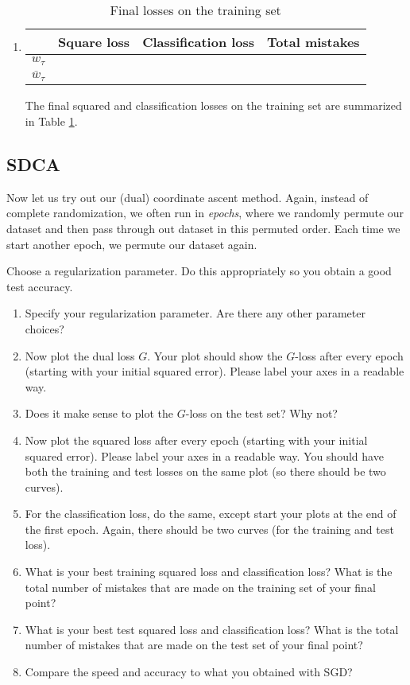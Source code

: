 \documentclass{article}
\begin{document}
\begin{enumerate}
	\item
	\begin{table}[h]
		\centering
		\begin{tabular}{|c|c|c|c|}
		     & {\bf Square loss} & {\bf Classification loss} & {\bf Total mistakes}  \\ \hline
		     $w_\tau$ & 	&	 &	\\ \hline
		     $\overline w_\tau$ & 	&	 &	\\ \hline
		\end{tabular}
		\caption{Final losses on the training set}
		\label{tab:sgd_final_loss_train}
	\end{table}

	The final squared and classification losses on the training set are summarized in Table \ref{tab:sgd_final_loss_train}.

\end{enumerate}



\subsection{SDCA}
Now let us try out our (dual) coordinate ascent method. Again, instead of complete randomization, we often run in \emph{epochs}, where we randomly permute our dataset and then pass through out dataset in this permuted order. Each time we start another epoch, we permute our dataset again.

Choose a regularization parameter. Do this appropriately so you obtain a good test accuracy.

\begin{enumerate}
	\item Specify your regularization parameter. Are there any other parameter choices?
	\item  Now plot the dual loss $G$. Your plot should show the $G$-loss after every epoch (starting with your initial squared error). Please label your axes in a readable way.
	\item Does it make sense to plot the $G$-loss on the test set? Why not?
	\item  Now plot the squared loss after every epoch (starting with your initial squared error). Please label your axes in a readable way.  You should have both the training and test losses on the same plot (so there should be two curves).
	\item  For the classification loss, do the same, except start your plots at the end of the first epoch. Again, there should be two curves (for the training and test loss).
	\item   What is your best training squared loss and classification loss? What is the total number of mistakes that are made on the training set of your final point?
	\item   What is your best test squared loss and classification loss? What is the total number of mistakes that are made on the test set of your final point?
	\item Compare the speed and accuracy to what you obtained with SGD?
\end{enumerate}
\end{document}
